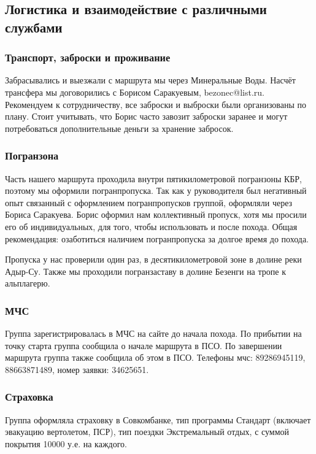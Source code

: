 	\subsection{Логистика и взаимодействие с различными службами}
		\subsubsection{Транспорт, заброски и проживание}
		Забрасывались и выезжали с маршрута мы через Минеральные Воды. Насчёт трансфера мы договорились с Борисом Саракуевым, bezonec@list.ru. Рекомендуем к сотрудничеству, все заброски и выброски были организованы по плану. Стоит учитывать, что Борис часто завозит заброски заранее и могут потребоваться дополнительные деньги за хранение забросок.

		\subsubsection{Погранзона}

		Часть нашего маршрута проходила внутри пятикилометровой погранзоны КБР, поэтому мы оформили погранпропуска. Так как у руководителя был негативный опыт связанный с оформлением погранпропусков группой, оформляли через Бориса Саракуева. Борис оформил нам коллективный пропуск, хотя мы просили его об индивидуальных, для того, чтобы использовать и после похода. Общая рекомендация: озаботиться наличием погранпропуска за долгое время до похода.

		Пропуска у нас проверили один раз, в десятикилометровой зоне в долине реки Адыр-Су. Также мы проходили погранзаставу в долине Безенги на тропе к альплагерю.


		\subsubsection{МЧС}
		Группа зарегистрировалась в МЧС на сайте до начала похода. По прибытии на точку старта группа сообщила о начале маршрута в ПСО. По завершении маршрута группа также сообщила об этом в ПСО. Телефоны мчс: 89286945119, 88663871489, номер заявки: 34625651.

		\subsubsection{Страховка}
			Группа оформляла страховку в Совкомбанке, тип программы Стандарт (включает эвакуацию вертолетом, ПСР), тип поездки Экстремальный отдых, с суммой покрытия 10000 у.е. на каждого.
 
